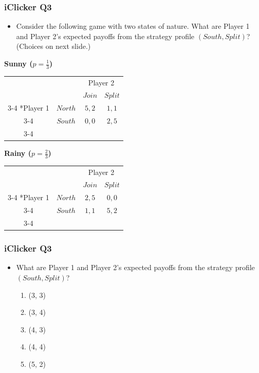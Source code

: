 \begin{frame}
\frametitle{iClicker Q3}
\begin{itemize}
\item Consider the following game with two states of nature. What are Player 1 and Player 2's expected payoffs from the strategy profile $(South, Split)$? (Choices on next slide.)
\end{itemize}
\begin{table}[h]
\begin{minipage}{0.49\linewidth}
	\centering
	\textbf{Sunny ($p = \frac{1}{3}$)}\\
	\begin{tabular}{cc|c|c|}
		& \multicolumn{1}{c}{} & \multicolumn{2}{c}{Player 2}\\
		& \multicolumn{1}{c}{} & \multicolumn{1}{c}{$Join$}  & \multicolumn{1}{c}{$Split$} \\\cline{3-4}
		\multirow{2}*{Player 1}  & $North$ & $5, 2$ & $1, 1$ \\\cline{3-4}
		& $South$ & $0, 0$ & $2, 5$ \\\cline{3-4}
	\end{tabular}
\end{minipage}
\begin{minipage}{0.49\linewidth}
	\centering
	\textbf{Rainy ($p = \frac{2}{3}$)}\\
	\begin{tabular}{cc|c|c|}
		& \multicolumn{1}{c}{} & \multicolumn{2}{c}{Player 2}\\
		& \multicolumn{1}{c}{} & \multicolumn{1}{c}{$Join$}  & \multicolumn{1}{c}{$Split$} \\\cline{3-4}
		\multirow{2}*{Player 1}  & $North$ & $2, 5$ & $0, 0$ \\\cline{3-4}
		& $South$ & $1, 1$ & $5, 2$ \\\cline{3-4}
	\end{tabular}
\end{minipage}
\end{table}
\end{frame}


\begin{frame}
\frametitle{iClicker Q3}
\begin{itemize}
\item What are Player 1 and Player 2's expected payoffs from the strategy profile $(South, Split)$?
\begin{enumerate}
\item (3, 3)
\item (3, 4)
\item (4, 3)
\item (4, 4)
\item (5, 2)
\end{enumerate}
\end{itemize}
\end{frame}

